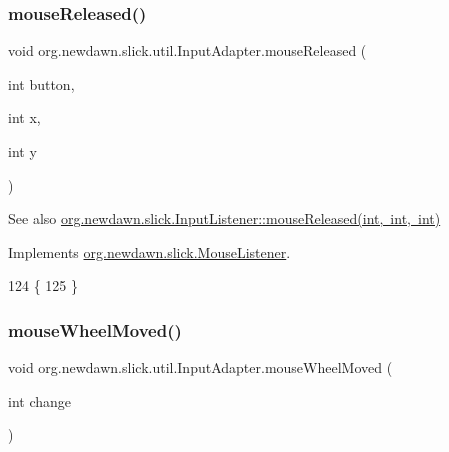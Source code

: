 \subsubsection{\texorpdfstring{mouse\+Released()}{mouseReleased()}}
{\footnotesize\ttfamily void org.\+newdawn.\+slick.\+util.\+Input\+Adapter.\+mouse\+Released (\begin{DoxyParamCaption}\item[{int}]{button,  }\item[{int}]{x,  }\item[{int}]{y }\end{DoxyParamCaption})\hspace{0.3cm}{\ttfamily [inline]}}

\begin{DoxySeeAlso}{See also}
\mbox{\hyperlink{interfaceorg_1_1newdawn_1_1slick_1_1_mouse_listener_a8d1606869f610664f9299565067d5571}{org.\+newdawn.\+slick.\+Input\+Listener\+::mouse\+Released(int, int, int)}} 
\end{DoxySeeAlso}


Implements \mbox{\hyperlink{interfaceorg_1_1newdawn_1_1slick_1_1_mouse_listener_a8d1606869f610664f9299565067d5571}{org.\+newdawn.\+slick.\+Mouse\+Listener}}.


\begin{DoxyCode}
124                                                         \{
125     \}
\end{DoxyCode}
\mbox{\label{classorg_1_1newdawn_1_1slick_1_1util_1_1_input_adapter_aecf65d222bf9de39735ce38ae2f97ad3}} 
\subsubsection{\texorpdfstring{mouse\+Wheel\+Moved()}{mouseWheelMoved()}}
{\footnotesize\ttfamily void org.\+newdawn.\+slick.\+util.\+Input\+Adapter.\+mouse\+Wheel\+Moved (\begin{DoxyParamCaption}\item[{int}]{change }\end{DoxyParamCaption})\hspace{0.3cm}{\ttfamily [inline]}}

